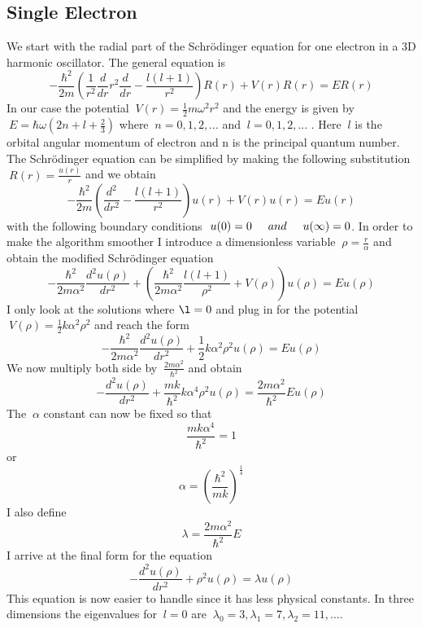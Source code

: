 \documentclass[11pt,a4wide]{article}
\begin{document}
\subsection{Single Electron}
We start with the radial part of the Schr\"odinger equation for one electron in a 3D harmonic oscillator. The general equation is
\[
  -\frac{\hbar^2}{2m} \left (\frac{1}{r^2} \frac{d}{dr} r^2 \frac{d}{dr} - \frac{l(l+1)}{r^2} \right)R(r) + V(r)R(r) = ER(r)
\]
In our case the potential $\ V(r)=\frac{1}{2}m\omega^2r^2$ and the energy is given by $\ E = \hbar\omega \left (2n + l + \frac{2}{3}\right)$ where $\ n=0,1,2,...$ and $\ l=0,1,2,...$ . Here $\ l$ is the orbital angular momentum of electron and n is the principal quantum number. The Schr\"odinger equation can be simplified by making the following substitution $\ R(r)=\frac{u(r)}{r}$ and we obtain 
\[
  -\frac{\hbar^2}{2m} \left (\frac{d^2}{dr^2} - \frac{l(l+1)}{r^2} \right)u(r) + V(r)u(r)= Eu(r)
\]
with the following boundary conditions $\ u(0)=0 \hspace{0.5cm} and  \hspace{0.5cm} u(\infty)=0$. In order to make the algorithm smoother I introduce a dimensionless variable $\ \rho=\frac{r}{\alpha}$ and obtain the modified Schr\"odinger equation 
\[
  -\frac{\hbar^2}{2m\alpha^2}\frac{d^2u(\rho)}{dr^2} + \left(\frac{\hbar^2}{2m\alpha^2}\frac{l(l+1)}{\rho^2} + V(\rho)        \right)u(\rho)= Eu(\rho)
\]
I only look at the solutions where $\l=0$ and plug in for the potential $\ V(\rho)=\frac{1}{2}k\alpha^2\rho^2$ and reach the form
\[
  -\frac{\hbar^2}{2m\alpha^2}\frac{d^2u(\rho)}{dr^2} +  \frac{1}{2}k\alpha^2\rho^2u(\rho)= Eu(\rho)
\]
We now multiply both side by $\ \frac{2m\alpha^2}{\hbar^2}$ and obtain 
\[
   -\frac{d^2u(\rho)}{dr^2} +  \frac{mk}{\hbar^2}k\alpha^4\rho^2u(\rho)=\frac{2m\alpha^2}{\hbar^2}Eu(\rho)
\]
The $\ \alpha$ constant can now be fixed so that 
\[
   \frac{mk\alpha^4}{\hbar^2}=1
\]
or 
\[
   \alpha=\left(\frac{\hbar^2}{mk}\right)^\frac{1}{4}
\]
I also define 
\[
	\lambda = \frac{2m\alpha^2}{\hbar^2}E
\]
I arrive at the final form for the equation 
\begin{equation}
   -\frac{d^2u(\rho)}{dr^2} + \rho^2u(\rho)=\lambda u(\rho)
\end{equation}
This equation is now easier to handle since it has less physical constants. In three dimensions the eigenvalues for $\ l=0$ are $\ {\lambda}_0 = 3, {\lambda}_1 = 7, {\lambda}_2= 11, ... $. 
\end{document}
